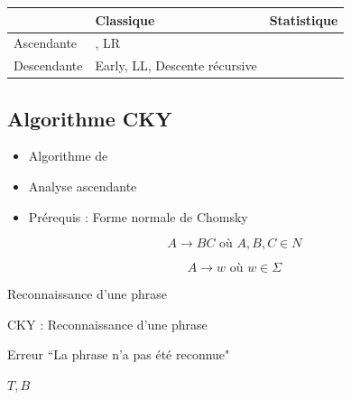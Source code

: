 \documentclass{KodeBook}
\begin{document}
\begin{center}
	\begin{tabular}{|p{}|p{}|p{}|}
		\hline
		& Classique & Statistique \\
		\hline
		Ascendante & \optword{CKY}, LR & \optword{CKY probabiliste}\\
		\hline
		Descendante & Early, LL, Descente récursive  & \\
		\hline
	\end{tabular}
\end{center}

\subsection{Algorithme CKY}

\begin{itemize}
	\item Algorithme de 
	\item Analyse ascendante
	\item Prérequis : Forme normale de Chomsky
\end{itemize}

\begin{definition}
	\[
	A \rightarrow  B C \text{ où } A, B, C \in N
	\]
	
	\[
	A \rightarrow w \text{ où } w \in \Sigma
	\]
\end{definition}

Reconnaissance d'une phrase
\begin{block}{CKY : Reconnaissance d'une phrase}
	\scriptsize\vspace{-3pt}
	\begin{algorithm}[H]
		
		
		
		 {
			Erreur ``La phrase n'a pas été reconnue"\;
		}
		
		\Retour $T, B$ \;
		\vspace{-3pt}
	\end{algorithm}
\end{block}
\end{document}
